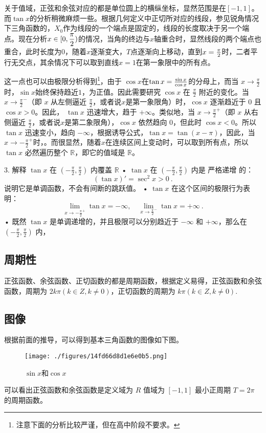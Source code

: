 关于值域，正弦和余弦对应的都是单位圆上的横纵坐标，显然范围是在$[-1,1]$。而$\tan x$的分析稍微麻烦一些。根据几何定义中正切所对应的线段，参见锐角情况下三角函数的，$X_0$作为线段的一个端点是固定的，线段的长度取决于另一个端点。现在分析$\displaystyle x\in[0,{\pi\over2})$的情况，当角的终边与$x$轴重合时，显然线段的两个端点也重合，此时长度为$0$，随着$x$逐渐变大，$T$点逐渐向上移动，直到$x={\pi\over2}$时，二者平行无交点，其余情况下可以取到直线$x=1$在第一象限中的所有点。

这一点也可以由极限分析得到\footnote{注意下面的分析比较严谨，但在高中阶段不要求。}，由于 $\cos x$在$\tan x={\sin x\over\cos x}$的分母上，而当 $x \to \frac{\pi}{2}$时，$\sin x $始终保持趋近$1$，为正值。因此需要研究 $\cos x$ 在 $\frac{\pi}{2}$ 附近的变化。当 $x \to \frac{\pi}{2}^-$（即 $x$ 从左侧逼近 $\frac{\pi}{2}$，或者说$x$是第一象限角）时，$\cos x$ 逐渐趋近于 $0$ 且 $\cos x > 0$。因此， $\tan x$ 迅速增大，趋于 $+\infty$。类似地，当 $x \to \frac{\pi}{2}^+$（即 $x$ 从右侧逼近 $\frac{\pi}{2}$，或者说$x$是第二象限角），$\cos x$ 依然趋向 $0$，但此时 $\cos x < 0$。所以 $\tan x$ 迅速变小，趋向 $-\infty$，根据诱导公式，$\tan x=\tan(x-\pi)$，因此，当$x \to -\frac{\pi}{2}^+$时，。而很显然，随着$x$在连续区间上变动时，可以取到所有点，所以$\tan x$ 必然遍历整个 $\mathbb{R}$，即它的值域是 $\mathbb{R}$。

3. 解释 $\tan x$ 在 $(-\frac{\pi}{2}, \frac{\pi}{2})$ 内覆盖 $\mathbb{R}$
	•	$\tan x$ 在 $(-\frac{\pi}{2}, \frac{\pi}{2})$ 内是 严格递增 的：
$$
(\tan x)' = \sec^2 x > 0~.
$$
说明它是单调函数，不会有间断的跳跃值。
	•	$\tan x$ 在这个区间的极限行为表明：
$$
\lim\limits_{x \to -\frac{\pi}{2}^+} \tan x = -\infty, \quad \lim\limits_{x \to \frac{\pi}{2}^-} \tan x = +\infty~.
$$
	•	既然 $\tan x$ 是单调递增的，并且极限可以分别趋近于 $-\infty$ 和 $+\infty$，那么在 $(-\frac{\pi}{2}, \frac{\pi}{2})$ 内，

\subsection{周期性}

正弦函数、余弦函数、正切函数的都是周期函数，根据定义易得，正弦函数和余弦函数，周期为 $2k\pi(k\in Z,k\neq0)$，正切函数的周期为 $k\pi(k\in Z,k\neq0)$.


\subsection{图像}
根据前面的推导，可以得到基本三角函数的图像如下图。
\begin{figure}[ht]
\centering
\texttt{[image: ./figures/14fd66d8d1e6e0b5.png]}
\caption{$\sin x$和$\cos x$} \label{fig_HsTFFv_1}
\end{figure}
可以看出正弦函数和余弦函数是定义域为 $R$ 值域为 $[-1,1]$ 最小正周期 $T = 2\pi$ 的周期函数。

